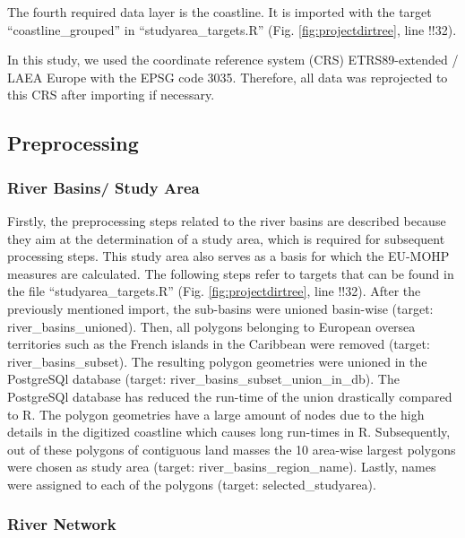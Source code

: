 \documentclass[fleqn,10pt]{wlscirep}
\begin{document}
The fourth required data layer is the coastline. It is imported with the target ``coastline\_grouped'' in ``studyarea\_targets.R'' (Fig. \ref{fig:projectdirtree}, line !!32).

In this study, we used the coordinate reference system (CRS) ETRS89-extended / LAEA Europe with the EPSG code 3035. Therefore, all data was reprojected to this CRS after importing if necessary.

\hypertarget{preprocessing}{%
\subsection{Preprocessing}\label{preprocessing}}

\hypertarget{river-basins-study-area}{%
\subsubsection*{River Basins/ Study Area}\label{river-basins-study-area}}

Firstly, the preprocessing steps related to the river basins are described because they aim at the determination of a study area, which is required for subsequent processing steps. This study area also serves as a basis for which the EU-MOHP measures are calculated. The following steps refer to targets that can be found in the file ``studyarea\_targets.R'' (Fig. \ref{fig:projectdirtree}, line !!32). After the previously mentioned import, the sub-basins were unioned basin-wise (target: river\_basins\_unioned). Then, all polygons belonging to European oversea territories such as the French islands in the Caribbean were removed (target: river\_basins\_subset). The resulting polygon geometries were unioned in the PostgreSQl database (target: river\_basins\_subset\_union\_in\_db). The PostgreSQl database has reduced the run-time of the union drastically compared to R. The polygon geometries have a large amount of nodes due to the high details in the digitized coastline which causes long run-times in R. Subsequently, out of these polygons of contiguous land masses the 10 area-wise largest polygons were chosen as study area (target: river\_basins\_region\_name). Lastly, names were assigned to each of the polygons (target: selected\_studyarea).

\hypertarget{river-network}{%
\subsubsection*{River Network}\label{river-network}}
\end{document}
